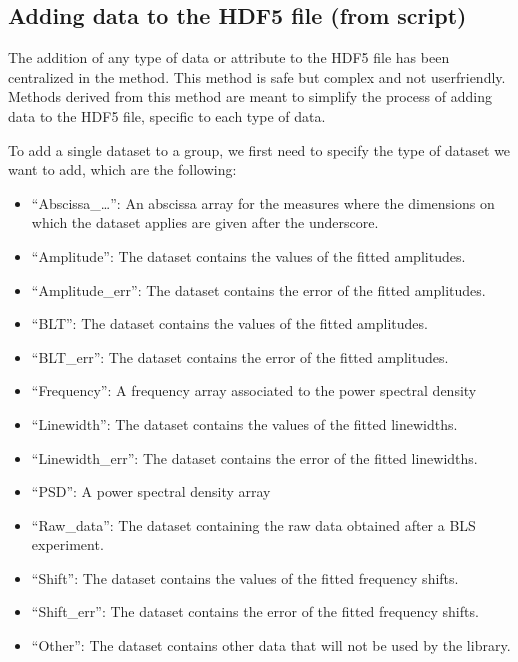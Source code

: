 \documentclass[letterpaper,10pt,english]{sphinxmanual}
\begin{document}
\subsection{Adding data to the HDF5 file (from script)}
\label{\detokenize{source/hdf5_bls_package:adding-data-to-the-hdf5-file-from-script}}
\sphinxAtStartPar
The addition of any type of data or attribute to the HDF5 file has been centralized in the  method. This method is safe but complex and not user\sphinxhyphen{}friendly. Methods derived from this method are meant to simplify the process of adding data to the HDF5 file, specific to each type of data.

\sphinxAtStartPar
To add a single dataset to a group, we first need to specify the type of dataset we want to add, which are the following:
\begin{itemize}
\item {} 
\sphinxAtStartPar
“Abscissa\_…”: An abscissa array for the measures where the dimensions on which the dataset applies are given after the underscore.

\item {} 
\sphinxAtStartPar
“Amplitude”: The dataset contains the values of the fitted amplitudes.

\item {} 
\sphinxAtStartPar
“Amplitude\_err”: The dataset contains the error of the fitted amplitudes.

\item {} 
\sphinxAtStartPar
“BLT”: The dataset contains the values of the fitted amplitudes.

\item {} 
\sphinxAtStartPar
“BLT\_err”: The dataset contains the error of the fitted amplitudes.

\item {} 
\sphinxAtStartPar
“Frequency”: A frequency array associated to the power spectral density

\item {} 
\sphinxAtStartPar
“Linewidth”: The dataset contains the values of the fitted linewidths.

\item {} 
\sphinxAtStartPar
“Linewidth\_err”: The dataset contains the error of the fitted linewidths.

\item {} 
\sphinxAtStartPar
“PSD”: A power spectral density array

\item {} 
\sphinxAtStartPar
“Raw\_data”: The dataset containing the raw data obtained after a BLS experiment.

\item {} 
\sphinxAtStartPar
“Shift”: The dataset contains the values of the fitted frequency shifts.

\item {} 
\sphinxAtStartPar
“Shift\_err”: The dataset contains the error of the fitted frequency shifts.

\item {} 
\sphinxAtStartPar
“Other”: The dataset contains other data that will not be used by the library.

\end{itemize}
\end{document}
